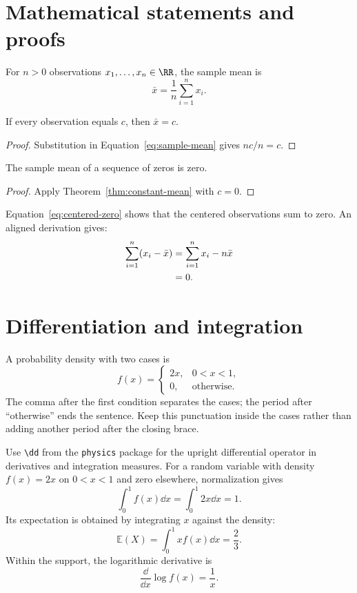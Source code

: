 \section{Mathematical statements and proofs}
\begin{definition}
  For $n>0$ observations $x_1,\ldots,x_n\in\RR$, the sample mean is
  \begin{equation}
    \label{eq:sample-mean}
    \bar{x} = \frac{1}{n} \sum_{i=1}^{n} x_i.
  \end{equation}
\end{definition}
\begin{theorem}
  \label{thm:constant-mean}
  If every observation equals $c$, then $\bar{x}=c$.
\end{theorem}
\begin{proof}
  Substitution in Equation~\eqref{eq:sample-mean} gives $nc/n=c$.
\end{proof}
\begin{corollary}
  The sample mean of a sequence of zeros is zero.
\end{corollary}
\begin{proof}
  Apply Theorem~\ref{thm:constant-mean} with $c=0$.
\end{proof}
Equation~\eqref{eq:centered-zero} shows that the centered observations sum to
zero. An aligned derivation gives:
\begin{align}
  \sum_{i=1}^{n}(x_i-\bar{x}) &= \sum_{i=1}^{n} x_i - n \bar{x}
  \notag\\
  &= 0.\label{eq:centered-zero}
\end{align}


\section{Differentiation and integration}
A probability density with two cases is
\begin{equation}
  \label{eq:piecewise-density}
  f(x) =
  \begin{cases}
    2x, & 0<x<1, \\
    0, & \text{otherwise}.
  \end{cases}
\end{equation}
The comma after the first condition separates the cases; the period after
``otherwise'' ends the sentence. Keep this punctuation inside the cases
rather than adding another period after the closing brace.


Use \verb|\dd| from the \texttt{physics} package for the upright differential
operator in derivatives and integration measures. For a random variable
with density $f(x)=2x$ on $0<x<1$ and zero elsewhere, normalization gives
\[
  \int_0^1 f(x)\dd{x}=\int_0^1 2x\dd{x}=1.
\]
Its expectation is obtained by integrating $x$ against the density:
\[
  \mathbb{E}(X)=\int_0^1 x f(x)\dd{x}=\frac{2}{3}.
\]
Within the support, the logarithmic derivative is
\[
  \frac{\dd}{\dd x}\log f(x)=\frac{1}{x}.
\]


